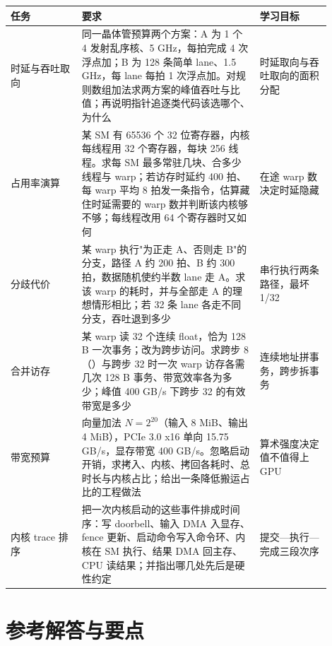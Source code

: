 \begin{longtable}{L{0.2\linewidth}L{0.5\linewidth}L{0.2\linewidth}}
\toprule
任务 & 要求 & 学习目标 \\
\midrule
时延与吞吐取向 & 同一晶体管预算两个方案：A 为 1 个 4 发射乱序核、5 GHz，每拍完成 4 次浮点加；B 为 128 条简单 lane、1.5 GHz，每 lane 每拍 1 次浮点加。对规则数组加法求两方案的峰值吞吐与比值；再说明指针追逐类代码该选哪个、为什么 & 时延取向与吞吐取向的面积分配 \\
占用率演算 & 某 SM 有 65536 个 32 位寄存器，内核每线程用 32 个寄存器，每块 256 线程。求每 SM 最多常驻几块、合多少线程与 warp；若访存时延约 400 拍、每 warp 平均 8 拍发一条指令，估算藏住时延需要的 warp 数并判断该内核够不够；每线程改用 64 个寄存器时又如何 & 在途 warp 数决定时延隐藏 \\
分歧代价 & 某 warp 执行"为正走 A、否则走 B"的分支，路径 A 约 200 拍、B 约 300 拍，数据随机使约半数 lane 走 A。求该 warp 的耗时，并与全部走 A 的理想情形相比；若 32 条 lane 各走不同分支，吞吐退到多少 & 串行执行两条路径，最坏 1/32 \\
合并访存 & 某 warp 读 32 个连续 float，恰为 128 B 一次事务；改为跨步访问。求跨步 8（）与跨步 32 时一次 warp 访存各需几次 128 B 事务、带宽效率各为多少；峰值 400 GB/s 下跨步 32 的有效带宽是多少 & 连续地址拼事务，跨步拆事务 \\
带宽预算 & 向量加法 $N=2^{20}$（输入 8 MiB、输出 4 MiB），PCIe 3.0 x16 单向 15.75 GB/s，显存带宽 400 GB/s。忽略启动开销，求拷入、内核、拷回各耗时、总时长与内核占比；给出一条降低搬运占比的工程做法 & 算术强度决定值不值得上 GPU \\
内核 trace 排序 & 把一次内核启动的这些事件排成时间序：写 doorbell、输入 DMA 入显存、fence 更新、启动命令写入命令环、内核在 SM 执行、结果 DMA 回主存、CPU 读结果；并指出哪几处先后是硬性约定 & 提交—执行—完成三段次序 \\
\bottomrule
\end{longtable}

\section*{参考解答与要点}

